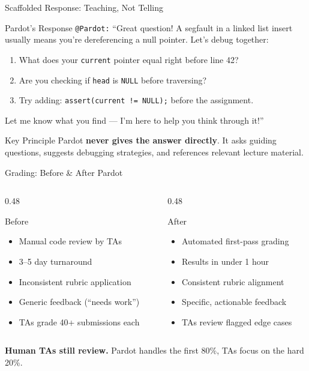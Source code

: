 \documentclass[aspectratio=169]{beamer}
\begin{document}
\begin{frame}{Scaffolded Response: Teaching, Not Telling}
\begin{block}{Pardot's Response}
\small
\texttt{@Pardot:} ``Great question! A segfault in a linked list insert usually means you're dereferencing a null pointer. Let's debug together:
\begin{enumerate}
  \item What does your \texttt{current} pointer equal right before line 42?
  \item Are you checking if \texttt{head} is \texttt{NULL} before traversing?
  \item Try adding: \texttt{assert(current != NULL);} before the assignment.
\end{enumerate}
Let me know what you find --- I'm here to help you think through it!''
\end{block}
\vspace{0.5em}
\begin{alertblock}{Key Principle}
Pardot \textbf{never gives the answer directly}. It asks guiding questions, suggests debugging strategies, and references relevant lecture material.
\end{alertblock}
\end{frame}

\begin{frame}{Grading: Before \& After Pardot}
\begin{columns}[T]
\begin{column}{0.48\textwidth}
\begin{block}{Before}
\begin{itemize}
  \item Manual code review by TAs
  \item 3--5 day turnaround
  \item Inconsistent rubric application
  \item Generic feedback (``needs work'')
  \item TAs grade 40+ submissions each
\end{itemize}
\end{block}
\end{column}
\begin{column}{0.48\textwidth}
\begin{block}{After}
\begin{itemize}
  \item Automated first-pass grading
  \item Results in under 1 hour
  \item Consistent rubric alignment
  \item Specific, actionable feedback
  \item TAs review flagged edge cases
\end{itemize}
\end{block}
\end{column}
\end{columns}
\vfill
\begin{center}
\textbf{Human TAs still review.} Pardot handles the first 80\%, TAs focus on the hard 20\%.
\end{center}
\end{frame}
\end{document}
